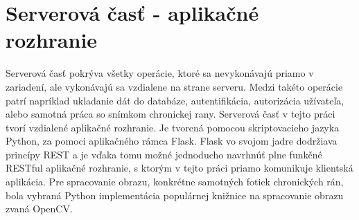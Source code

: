 \section{Serverová časť - aplikačné rozhranie}
Serverová časť pokrýva všetky operácie, ktoré sa nevykonávajú priamo v zariadení, ale vykonávajú sa vzdialene na strane serveru. Medzi takéto operácie patrí napríklad ukladanie dát do databáze, autentifikácia, autorizácia užívateľa, alebo samotná práca so snímkom chronickej rany. Serverová časť v tejto práci tvorí vzdialené aplikačné rozhranie. Je tvorená pomocou skriptovacieho jazyka Python, za pomoci aplikačného rámca Flask. Flask vo svojom jadre dodržiava princípy REST a je vďaka tomu možné jednoducho navrhnúť plne funkčné RESTful aplikačné rozhranie, s ktorým v tejto práci priamo komunikuje klientská aplikácia. Pre spracovanie obrazu, konkrétne samotných fotiek chronických rán, bola vybraná Python implementácia populárnej knižnice na spracovanie obrazu zvaná OpenCV.
